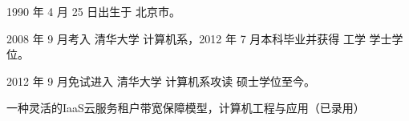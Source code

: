 \begin{resume}


  1990 年 4 月 25 日出生于 北京市。

  2008 年 9 月考入 清华大学 计算机系，2012 年 7 月本科毕业并获得 工学 学士学位。

  2012 年 9 月免试进入 清华大学 计算机系攻读 硕士学位至今。


  \begin{enumerate}[{[}1{]}]
  \item 一种灵活的IaaS云服务租户带宽保障模型，计算机工程与应用（已录用）
  \end{enumerate}

\end{resume}

